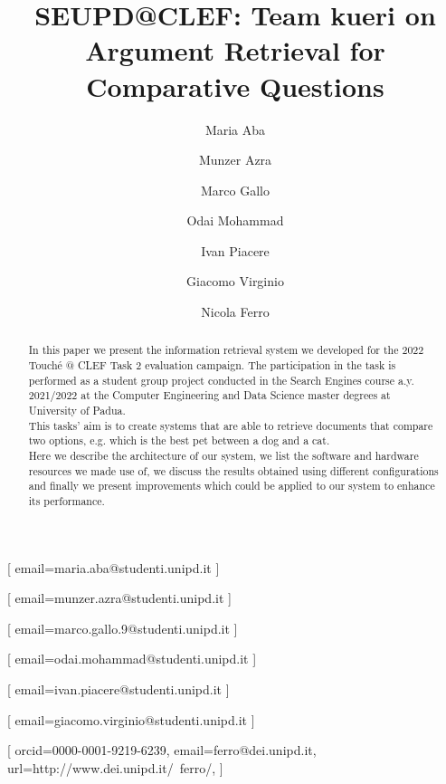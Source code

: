 \documentclass{ceurart}
\begin{document}

	
\title{SEUPD@CLEF: Team kueri on Argument Retrieval for Comparative Questions}

\author[1]{Maria Aba}[%
email=maria.aba@studenti.unipd.it
]

\author[1]{Munzer Azra}[%
email=munzer.azra@studenti.unipd.it
]

\author[1]{Marco Gallo}[%
email=marco.gallo.9@studenti.unipd.it
]

\author[1]{Odai Mohammad}[%
email=odai.mohammad@studenti.unipd.it
]

\author[1]{Ivan Piacere}[%
email=ivan.piacere@studenti.unipd.it
]

\author[1]{Giacomo Virginio}[%
email=giacomo.virginio@studenti.unipd.it
]

\author[1]{Nicola Ferro}[%
orcid=0000-0001-9219-6239,
email=ferro@dei.unipd.it,
url=http://www.dei.unipd.it/~ferro/,
]

\address[1]{University of Padua, Italy}


\begin{abstract}
	In this paper we present the information retrieval system we developed for the 2022 Touché @ CLEF Task 2 evaluation campaign. The participation in the task is performed as a student group project conducted in the Search Engines course a.y. 2021/2022 at the Computer Engineering and Data Science master degrees at University of Padua.\\
	This tasks' aim is to create systems that are able to retrieve documents that compare two options, e.g. which is the best pet between a dog and a cat.\\
	Here we describe the architecture of our system, we list the software and hardware resources we made use of, we discuss the results obtained using different configurations and finally we present improvements which could be applied to our system to enhance its performance.
\end{abstract}
\end{document}
